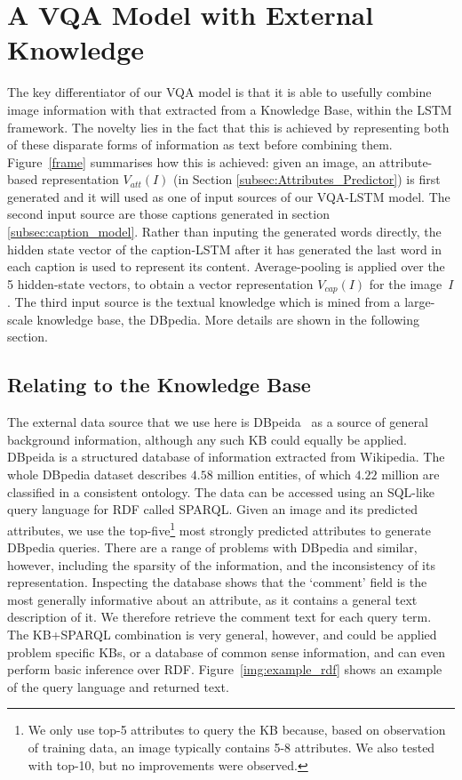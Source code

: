 \documentclass[10pt,journal,compsoc]{IEEEtran}
\def\Att{{V_{att}}}
\def\Cap{{V_{cap}}}
\begin{document}
\section{A VQA Model with External Knowledge}
\label{sec:vqa}
The key differentiator of our VQA model is that it is able to usefully combine image information with that extracted from a Knowledge Base, within the LSTM framework. The novelty lies in the fact that this is achieved by representing both of these disparate forms of information as text before combining them. Figure~\ref{frame} summarises how this is achieved: given an image, an attribute-based  representation $\Att(I)$ (in Section \ref{subsec:Attributes_Predictor}) is first generated and it will used as one of input sources of our VQA-LSTM model. The second input source are those captions generated in section \ref{subsec:caption_model}. Rather than inputing the generated words directly, the hidden state vector of the caption-LSTM after it has generated the last word in each caption is used to represent its content. Average-pooling is applied over the 5 hidden-state vectors, to obtain a vector representation $\Cap(I)$ for the image~$I$. The third input source is the textual knowledge which is mined from a large-scale knowledge base, the DBpedia. More details are shown in the following section.

\subsection{Relating to the Knowledge Base}

The external data source that we use here is DBpeida~\cite{auer2007dbpedia} as a source of general background information, although any such KB could equally be applied. DBpeida is a structured database of information extracted from Wikipedia. The whole DBpedia dataset describes $4.58$ million entities, of which $4.22$ million are classified in a consistent ontology. The data can be accessed using an SQL-like query language for RDF called SPARQL. Given an image and its predicted attributes, we use the top-five\footnote{We only use top-5 attributes to query the KB because, based on observation of training data, an image typically contains 5-8 attributes. We also tested with top-10, but no improvements were observed.} most strongly predicted attributes to generate DBpedia queries. There are a range of problems with DBpedia and similar, however, including the sparsity of the information, and the inconsistency of its representation. Inspecting the database shows that the `comment' field is the most generally informative about an attribute, as it contains a general text description of it.  We therefore retrieve the comment text for each query term. The KB+SPARQL combination is very general, however, and could be applied problem specific KBs, or a database of common sense information, and can even perform basic inference over RDF. Figure~\ref{img:example_rdf} shows an example of the query language and returned text.
\end{document}
